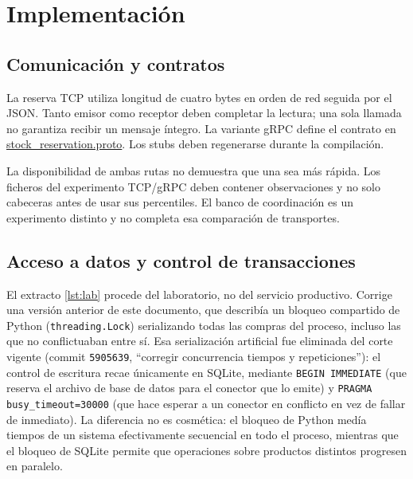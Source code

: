 \documentclass[12pt,a4paper]{article}
\newcommand{\evidencia}[2]{\href{https://github.com/JoseLozanoMorales/TiendaTech/blob/c5dca588ea9662cab56732c97fe644b9a929854b/#1}{#2}}
\newcommand{\seccion}[1]{\section{#1}}
\begin{document}
\seccion{Implementación}
\subsection{Comunicación y contratos}
La reserva TCP utiliza longitud de cuatro bytes en orden de red seguida por el JSON. Tanto emisor como receptor deben completar la lectura; una sola llamada no garantiza recibir un mensaje íntegro. La variante gRPC define el contrato en \evidencia{contracts/stock_reservation.proto}{stock\_reservation.proto}. Los stubs deben regenerarse durante la compilación.

La disponibilidad de ambas rutas no demuestra que una sea más rápida. Los ficheros del experimento TCP/gRPC deben contener observaciones y no solo cabeceras antes de usar sus percentiles. El banco de coordinación es un experimento distinto y no completa esa comparación de transportes.

\subsection{Acceso a datos y control de transacciones}
El extracto \ref{lst:lab} procede del laboratorio, no del servicio productivo. Corrige una versión anterior de este documento, que describía un bloqueo compartido de Python (\texttt{threading.Lock}) serializando todas las compras del proceso, incluso las que no conflictuaban entre sí. Esa serialización artificial fue eliminada del corte vigente (commit \texttt{5905639}, ``corregir concurrencia tiempos y repeticiones''): el control de escritura recae únicamente en SQLite, mediante \texttt{BEGIN IMMEDIATE} (que reserva el archivo de base de datos para el conector que lo emite) y \texttt{PRAGMA busy\_timeout=30000} (que hace esperar a un conector en conflicto en vez de fallar de inmediato). La diferencia no es cosmética: el bloqueo de Python medía tiempos de un sistema efectivamente secuencial en todo el proceso, mientras que el bloqueo de SQLite permite que operaciones sobre productos distintos progresen en paralelo.
\end{document}

